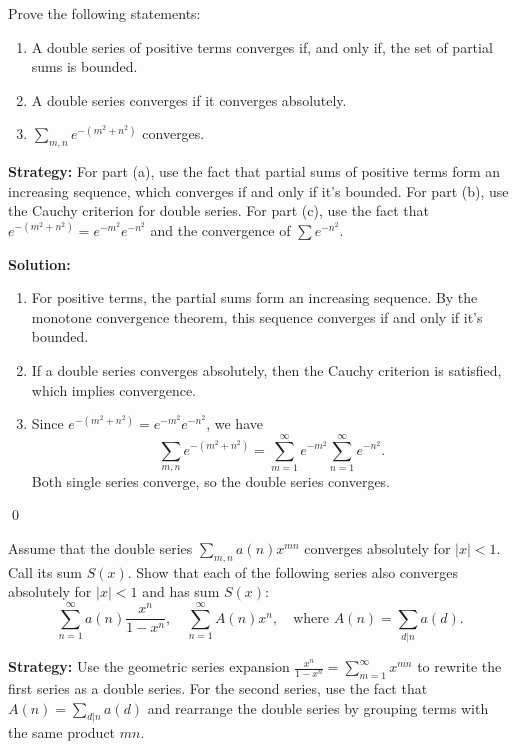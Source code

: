 \begin{problembox}
Prove the following statements:
\begin{enumerate}[label=\alph*)]
\item A double series of positive terms converges if, and only if, the set of partial sums is bounded.
\item A double series converges if it converges absolutely.
\item \(\sum_{m,n} e^{-(m^2+n^2)}\) converges.
\end{enumerate}
\end{problembox}

\noindent\textbf{Strategy:} For part (a), use the fact that partial sums of positive terms form an increasing sequence, which converges if and only if it's bounded. For part (b), use the Cauchy criterion for double series. For part (c), use the fact that \(e^{-(m^2+n^2)} = e^{-m^2} e^{-n^2}\) and the convergence of \(\sum e^{-n^2}\).

\bigskip\noindent\textbf{Solution:}
\begin{enumerate}[label=(\alph*)]
\item For positive terms, the partial sums form an increasing sequence. By the monotone convergence theorem, this sequence converges if and only if it's bounded.

\item If a double series converges absolutely, then the Cauchy criterion is satisfied, which implies convergence.

\item Since \(e^{-(m^2+n^2)} = e^{-m^2} e^{-n^2}\), we have 
\[\sum_{m,n} e^{-(m^2+n^2)} = \sum_{m=1}^{\infty} e^{-m^2} \sum_{n=1}^{\infty} e^{-n^2}.\]
Both single series converge, so the double series converges.
\end{enumerate}\qed



\begin{problembox}
Assume that the double series \(\sum_{m,n} a(n)x^{mn}\) converges absolutely for \(|x| < 1\). Call its sum \(S(x)\). Show that each of the following series also converges absolutely for \(|x| < 1\) and has sum \(S(x)\):
\[\sum_{n=1}^{\infty} a(n) \frac{x^n}{1 - x^n}, \quad \sum_{n=1}^{\infty} A(n)x^n, \quad \text{where } A(n) = \sum_{d|n} a(d).\]
\end{problembox}

\noindent\textbf{Strategy:} Use the geometric series expansion \(\frac{x^n}{1-x^n} = \sum_{m=1}^{\infty} x^{mn}\) to rewrite the first series as a double series. For the second series, use the fact that \(A(n) = \sum_{d|n} a(d)\) and rearrange the double series by grouping terms with the same product \(mn\).

